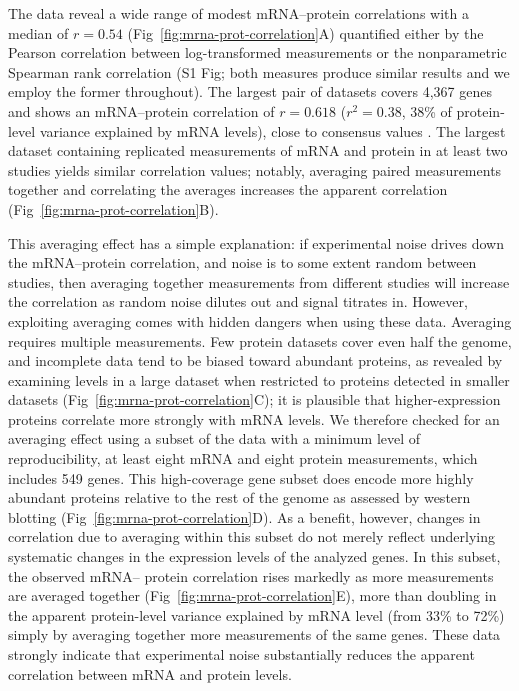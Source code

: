 \documentclass[10pt]{article}
\begin{document}
The data reveal a wide range of modest mRNA--protein correlations with
a median of \(r=0.54\) (Fig~\ref{fig:mrna-prot-correlation}A) quantified either by
the Pearson correlation between log-transformed measurements or the
nonparametric Spearman rank correlation (S1 Fig; both
measures produce similar results and we employ the former
throughout). The largest pair of datasets
covers 4,367 genes and shows an mRNA--protein correlation of
\(r=0.618\) (\(r^2=0.38\), 38\% of protein-level variance explained by
mRNA levels), close to consensus values \cite{vogel12}. The largest dataset containing replicated measurements of mRNA and protein in at least two studies yields similar correlation values; notably, averaging paired measurements together and correlating the averages increases the apparent correlation (Fig~\ref{fig:mrna-prot-correlation}B).

This averaging effect has a simple explanation: if experimental noise drives
down the mRNA--protein correlation, and noise is to some extent random between
studies, then averaging together measurements from different studies will
increase the correlation as random noise dilutes out and signal titrates in.
However, exploiting averaging comes with hidden dangers when using these data.
Averaging requires multiple measurements. Few protein datasets cover even half
the genome, and incomplete data tend to be biased toward abundant proteins, as
revealed by examining levels in a large dataset when restricted to proteins
detected in smaller datasets (Fig~\ref{fig:mrna-prot-correlation}C); it is
plausible that higher-expression proteins correlate more strongly with mRNA
levels. We therefore checked for an averaging effect using a subset of the
data with a minimum level of reproducibility, at least eight mRNA and eight
protein measurements, which includes 549 genes. This high-coverage gene
subset does encode more highly abundant proteins relative to the rest of the
genome as assessed by western blotting (Fig~\ref{fig:mrna-prot-correlation}D). 
As a benefit, however, changes in correlation due to averaging
within this subset do not merely reflect underlying systematic changes in the
expression levels of the analyzed genes. In this subset, the observed mRNA--
protein correlation rises markedly as more measurements are averaged together
(Fig~\ref{fig:mrna-prot-correlation}E), more than doubling in the apparent
protein-level variance explained by mRNA level (from 33\% to 72\%) simply by
averaging together more measurements of the same genes. These data strongly
indicate that experimental noise substantially reduces the apparent
correlation between mRNA and protein levels.
\end{document}
